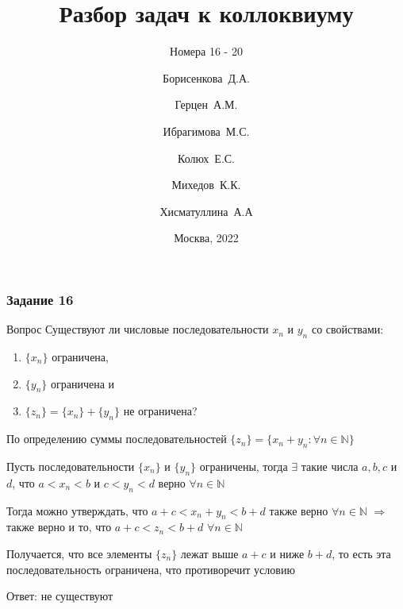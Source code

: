 \documentclass[8pt]{beamer}
\title[Коллоквиум]
{Разбор задач к коллоквиуму}
\subtitle{Номера 16 - 20}
\author[БИБ224]
{Борисенкова~Д.А. \and Герцен~А.М. \and Ибрагимова~М.С. \and Колюх~Е.С. \and Михедов~К.К. \and Хисматуллина~А.А}
\institute[НИУ ВШЭ]
{НИУ Высшая Школа Экономики}
\date{Москва, 2022}
\begin{document}
    
  \frame{\titlepage}

  \begin{frame}
    \frametitle{Задание 16}    

    \begin{block}{Вопрос}
        Существуют ли числовые последовательности $x_n$ и $y_n$ со свойствами:
        \begin{enumerate}
            \item $\{x_n\}$ ограничена,
            \item $\{y_n\}$ ограничена и
            \item $\{z_n\} = \{x_n\} + \{y_n\}$ не ограничена?
        \end{enumerate}
    \end{block}

    По определению суммы последовательностей $\{z_n\} = \{x_n + y_n: \forall n \in \mathbb{N}\}$

    Пусть последовательности $\{x_n\}$ и $\{y_n\}$ ограничены, тогда $\exists$ такие числа $a, b, c$ и $d$,
    что $a < x_n < b$ и $c < y_n < d$ верно $\forall n \in \mathbb{N}$

    Тогда можно утверждать, что $a + c < x_n + y_n < b + d$ также верно $\forall n \in \mathbb{N}$
    $\Rightarrow$ также верно и то, что $a + c < z_n < b + d$ $\forall n \in \mathbb{N}$

    Получается, что все элементы $\{z_n\}$ лежат выше $a+c$ и ниже $b + d$, то есть эта последовательность
    ограничена, что противоречит условию

    \begin{flushright}
        Ответ: не существуют
    \end{flushright}
  \end{frame}
\end{document}
